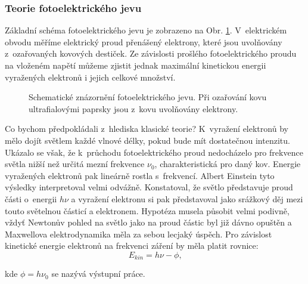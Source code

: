 \subsubsection{Teorie fotoelektrického jevu}
Základní schéma fotoelektrického jevu je zobrazeno na Obr. \ref{obr:Fotoefekt}. V~elektrickém obvodu měříme elektrický proud přenášený elektrony, které jsou uvolňovány z~ozařovaných kovových destiček. Ze závislosti prošlého fotoelektrického proudu na vloženém napětí můžeme zjistit jednak maximální kinetickou energii vyražených elektronů i jejich celkové množství.

\begin{figure} [ht]
\centering
\caption[Komplexní rovina]{Schematické znázornění fotoelektrického jevu. Při ozařování kovu ultrafialovými paprsky jsou z~kovu uvolňovány elektrony.}
\label{obr:Fotoefekt}
\end{figure}

Co bychom předpokládali z~hlediska klasické teorie? K~vyražení elektronů by mělo dojít světlem každé vlnové délky, pokud bude mít dostatečnou intenzitu. Ukázalo se však, že k~průchodu fotoelektrického proud nedocházelo pro frekvence světla nižší než určitá mezní frekvence $\nu_0$, charakteristická pro daný kov. Energie vyražených elektronů pak lineárně rostla s~frekvencí.
Albert Einstein tyto výsledky interpretoval velmi odvážně. Konstatoval, že světlo představuje proud části o~energii $h\nu$ a vyražení elektronu si pak představoval jako srážkový děj mezi touto světelnou částicí a elektronem. Hypotéza musela působit velmi podivně, vždyť Newtonův pohled na světlo jako na proud částic byl již dávno opuštěn a Maxwellova elektrodynamika měla za sebou lecjaký úspěch. Pro závislost kinetické energie elektronů na frekvenci záření by měla platit rovnice:
\begin{equation}
E_{kin} = h\nu - \phi\mbox{,}
\label{rov:Fotojev1}
\end{equation}

\noindent kde $\phi = h\nu_0$ se nazývá výstupní práce. 


